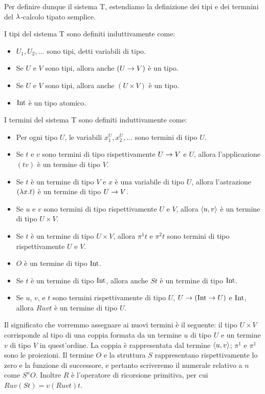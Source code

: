 \documentclass[]{marticle}
\begin{document}
Per definire dunque il sistema T, estendiamo la definizione dei tipi e dei
termnini del $\lambda$-calcolo tipato semplice. 
\begin{block}[Definizione]
    I tipi del sistema T sono definiti induttivamente come:
    \begin{itemize}
        \item $U_1, U_2, \dots$ sono tipi, detti variabili di tipo.
        \item Se $U$ e $V$ sono tipi, allora anche $(U\rightarrow V)$ \`e un tipo.
        \item Se $U$ e $V$ sono tipi, allora anche $(U\times V)$ \`e un tipo.
        \item $\text{Int}$ \`e un tipo atomico.
    \end{itemize}

    I termini del sistema T sono definiti induttivamente come:
    \begin{itemize}
        \item Per ogni tipo $U$, le variabili $x^U_1, x^U_2, \dots$ sono termini
            di tipo $U$.
        \item Se $t$ e $v$ sono termini di tipo rispettivamente $U\rightarrow V$ e $U$,
            allora l'applicazione $(tv)$ \`e un termine di tipo $V$.
        \item Se $t$ \`e un termine di tipo $V$ e $x$ \`e una variabile di tipo
            $U$, allora l'astrazione $(\lambda x.  t)$ \`e un termine di tipo $U\rightarrow
            V$.
        \item Se $u$ e $v$ sono termini di tipo rispettivamente $U$ e $V$,
            allora $\langle u,v \rangle$ \`e un termine di tipo $U\times V$.
        \item Se $t$ \`e un termine di tipo $U\times V$, allora $\pi^1 t$ e
            $\pi^2t$ sono termini di tipo rispettivamente $U$ e $V$.
        \item $O$ \`e un termine di tipo $\text{Int}$.
        \item Se $t$ \`e un termine di tipo $\text{Int}$, allora anche $St$ \`e un
            termine di tipo $\text{Int}$.
        \item Se $u$, $v$, e $t$ sono termini rispettivamente di tipo $U$,
            $U\rightarrow (\text{Int}\rightarrow U)$ e $\text{Int}$, allora $Ruvt$ \`e un termine di
            tipo $U$.
    \end{itemize}
\end{block}

Il significato che vorremmo assegnare ai nuovi termini \`e il seguente: 
il tipo $U\times V$ corrisponde al tipo di una coppia formata da un termine $u$
di tipo $U$ e un termine $v$ di tipo $V$ in quest'ordine. La coppia \`e
rappresentata dal termine $\langle u,v \rangle$; $\pi^1$ e $\pi^1$ sono le proiezioni.
Il termine $O$ e la struttura $S$ rappresentano rispettivamente lo zero e la
funzione di successore, e pertanto scriveremo il numerale relativo a $n$ come
$S^nO$. Inoltre $R$ \`e l'operatore di ricorsione primitiva, per cui $Ruv(St) =
v(Ruvt)t$.
\end{document}

